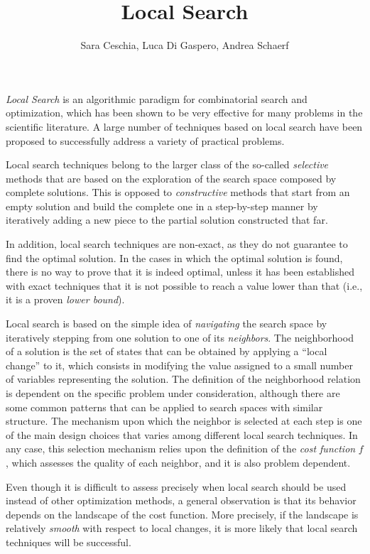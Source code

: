 \title{Local Search}
\label{chp:local-search}
\author{Sara Ceschia, Luca Di Gaspero, Andrea Schaerf}
\maketitle


\emph{Local Search} is an algorithmic paradigm for combinatorial
search and optimization, which has been shown to be very effective for many
problems in the scientific literature. A large number
of techniques based on local search have been proposed to successfully
address a variety of practical problems.


Local search techniques belong to the larger class of the so-called
\emph{selective} methods that are based on the exploration of the
search space composed by complete solutions. This is opposed to
\emph{constructive} methods that start from an empty solution and build the complete one in a step-by-step manner by iteratively adding a new piece to the partial solution constructed
that far.  

In addition, local search techniques are non-exact, as they
do not guarantee to find the optimal solution. In the cases in which
the optimal solution is found, there is no way to prove that it is
indeed optimal, unless it has been established
with exact techniques that it is not possible to reach a value lower than that (i.e., it is a proven \emph{lower bound}).

Local search is based on the simple idea of \emph{navigating} the
search space by iteratively stepping from one solution to one of its
\emph{neighbors}. The neighborhood of a solution is the set of states
that can be obtained by applying a ``local change'' to it, which consists in modifying the value assigned to a small number of variables representing the solution. The
definition of the neighborhood relation is dependent on the specific
problem under consideration, although there are some common
patterns that can be applied to search spaces with
similar structure.  The mechanism upon which the neighbor is selected
at each step is one of the main design choices that varies
among different local search techniques. In any case, this selection
mechanism relies upon the definition of the \emph{cost function} $f$,
which assesses the quality of each neighbor, and it is also
problem dependent.

Even though it is difficult to assess precisely when local search should be 
used instead of other optimization methods, a general observation is that 
its behavior depends on the landscape of the cost function. More precisely, if the 
landscape is relatively \emph{smooth} with respect to local 
changes, it is more likely that local search techniques will be successful.


